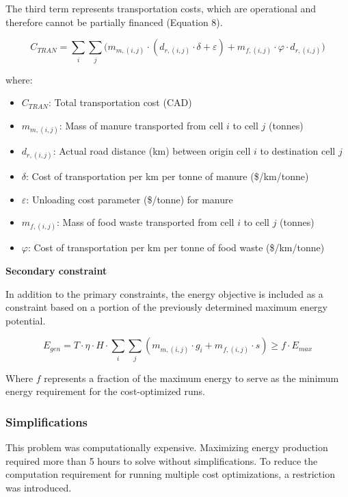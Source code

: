 \documentclass[12pt]{article}
\begin{document}
The third term represents transportation costs, which are operational and therefore cannot be partially financed (Equation 8).

\begin{equation}
  C_{TRAN} = \sum_{i}\sum_{j} \bigl(m_{m, (i,j)} \cdot (d_{r, (i, j)} \cdot \delta + \varepsilon) + m_{f, (i, j)} \cdot \varphi \cdot d_{r, (i,j)}\bigr)
\end{equation}

where:
\begin{itemize}
  \item $C_{TRAN}$: Total transportation cost (CAD)
  \item $m_{m, (i,j)}$: Mass of manure transported from cell $i$ to cell $j$ (tonnes)
  \item $d_{r, (i,j)}$: Actual road distance (km) between origin cell $i$ to destination cell $j$
  \item $\delta$: Cost of transportation per km per tonne of manure (\$/km/tonne)
  \item $\varepsilon$: Unloading cost parameter (\$/tonne) for manure
  \item $m_{f, (i,j)}$: Mass of food waste transported from cell $i$ to cell $j$ (tonnes)
  \item $\varphi$: Cost of transportation per km per tonne of food waste (\$/km/tonne)
\end{itemize}

\vspace{10pt}
\textbf{Secondary constraint}

In addition to the primary constraints, the energy objective is included as a constraint based on a portion of the previously determined maximum energy potential.

\begin{equation}
  E_{gen} = T \cdot \eta \cdot H \cdot \sum_{i}\sum_{j}(m_{m, (i, j)} \cdot g_i + m_{f, (i, j)} \cdot s) \geq f \cdot E_{max} 
\end{equation}

Where $f$ represents a fraction of the maximum energy to serve as the minimum energy requirement for the cost-optimized runs.

\subsubsection{Simplifications}
This problem was computationally expensive. Maximizing energy production required more than 5 hours to solve without simplifications. To reduce the computation requirement for running multiple cost optimizations, a restriction was introduced.
\end{document}
